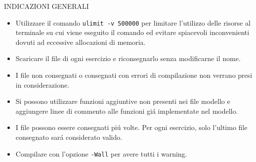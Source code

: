 \noindent\makebox[\linewidth]{\rule{\linewidth}{0.4pt}}
\begin{center}
INDICAZIONI GENERALI
\end{center}
\begin{itemize}
\item{Utilizzare il comando \texttt{ulimit -v 500000} per limitare l'utilizzo delle risorse al terminale su cui viene eseguito il comando ed evitare spiacevoli inconvenienti dovuti ad eccessive allocazioni di memoria.}
\item{Scaricare il file di ogni esercizio e riconsegnarlo senza modificarne il nome.}
\item{I file non consegnati o consegnati con errori di compilazione non verrano presi in considerazione. }
\item{Si possono utilizzare funzioni aggiuntive non presenti nei file modello e aggiungere linee di commento alle funzioni gi\'a implementate nel modello.}
\item{I file possono essere consegnati pi\'u volte. Per ogni esercizio, solo l'ultimo file consegnato sar\'a considerato valido.}
\item{Compilare con l'opzione \texttt{-Wall} per avere tutti i warning.}

\end{itemize}
\noindent\makebox[\linewidth]{\rule{\linewidth}{0.4pt}}

